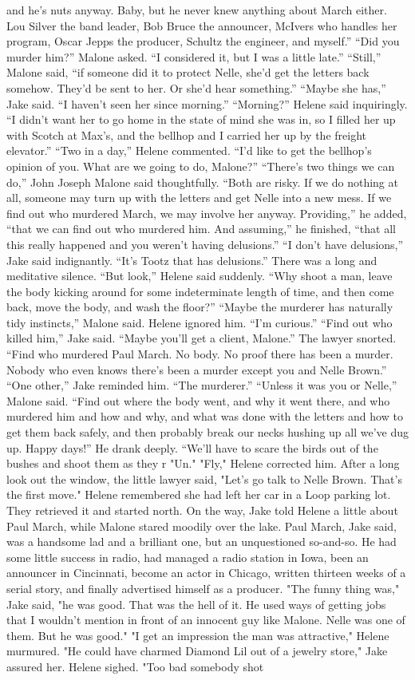 \documentclass{novel}
\begin{document}
and he’s nuts anyway. Baby, but he never knew anything about March either. Lou Silver the band leader, Bob Bruce the announcer, McIvers who handles her program, Oscar Jepps the producer, Schultz the engineer, and myself.” “Did you murder him?” Malone asked. “I considered it, but I was a little late.” “Still,” Malone said, “if someone did it to protect Nelle, she’d get the letters back somehow. They’d be sent to her. Or she’d hear something.” “Maybe she has,” Jake said. “I haven’t seen her since morning.” “Morning?” Helene said inquiringly. “I didn’t want her to go home in the state of mind she was in, so I filled her up with Scotch at Max’s, and the bellhop and I carried her up by the freight elevator.” “Two in a day,” Helene commented. “I’d like to get the bellhop’s opinion of you. What are we going to do, Malone?” “There’s two things we can do,” John Joseph Malone said thoughtfully. “Both are risky. If we do nothing at all, someone may turn up with the letters and get Nelle into a new mess. If we find out who murdered March, we may involve her anyway. Providing,” he added, “that we can find out who murdered him. And assuming,” he finished, “that all this really happened and you weren’t having delusions.” “I don’t have delusions,” Jake said indignantly. “It’s Tootz that has delusions.” There was a long and meditative silence. “But look,” Helene said suddenly. “Why shoot a man, leave the body kicking around for some indeterminate length of time, and then come back, move the body, and wash the floor?” “Maybe the murderer has naturally tidy instincts,” Malone said. Helene ignored him. “I’m curious.” “Find out who killed him,” Jake said. “Maybe you’ll get a client, Malone.” The lawyer snorted. “Find who murdered Paul March. No body. No proof there has been a murder. Nobody who even knows there’s been a murder except you and Nelle Brown.” “One other,” Jake reminded him. “The murderer.” “Unless it was you or Nelle,” Malone said. “Find out where the body went, and why it went there, and who murdered him and how and why, and what was done with the letters and how to get them back safely, and then probably break our necks hushing up all we’ve dug up. Happy days!” He drank deeply. “We’ll have to scare the birds out of the bushes and shoot them as they r "Un." "Fly," Helene corrected him. After a long look out the window, the little lawyer said, "Let’s go talk to Nelle Brown. That’s the first move." Helene remembered she had left her car in a Loop parking lot. They retrieved it and started north. On the way, Jake told Helene a little about Paul March, while Malone stared moodily over the lake. Paul March, Jake said, was a handsome lad and a brilliant one, but an unquestioned so-and-so. He had some little success in radio, had managed a radio station in Iowa, been an announcer in Cincinnati, become an actor in Chicago, written thirteen weeks of a serial story, and finally advertised himself as a producer. "The funny thing was," Jake said, "he was good. That was the hell of it. He used ways of getting jobs that I wouldn’t mention in front of an innocent guy like Malone. Nelle was one of them. But he was good." "I get an impression the man was attractive," Helene murmured. "He could have charmed Diamond Lil out of a jewelry store," Jake assured her. Helene sighed. "Too bad somebody shot 
\end{document}
